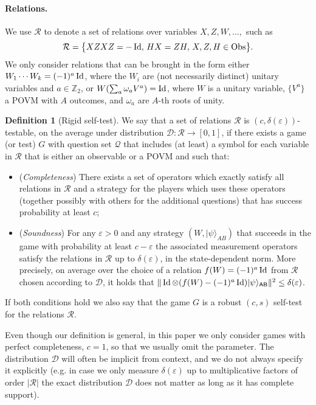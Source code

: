 \documentclass[11pt]{article}
\theoremstyle{remark}
\theoremstyle{definition}
\newtheorem{definition}[theorem]{Definition}
\newcommand{\ket}[1]{|#1\rangle}
\newcommand{\Id}{\ensuremath{\mathop{\rm Id}\nolimits}}
\newcommand{\reg}[1]{{\textsf{#1}}}
\newcommand{\Z}{\ensuremath{\mathbb{Z}}}
\newcommand{\setft}[1]{\mathrm{#1}}
\newcommand{\Obs}{\setft{Obs}}
\newcommand{\eps}{\varepsilon}
\begin{document}
\paragraph{Relations.}
We use $\mathcal{R}$ to denote a set of relations over variables $X,Z,W,\ldots,$ such as
$$\mathcal{R}=\big\{XZXZ=-\Id,\, HX=ZH,\,X,Z,H\in\Obs\big\}.$$
We only consider relations that can be brought in the form either $W_1\cdots W_k = (-1)^a \Id$, where the $W_i$ are (not necessarily distinct) unitary variables and $a\in\Z_2$, or $W ( \sum_a \omega_a V^a)=\Id$, where $W$ is a unitary variable, $\{V^a\}$ a POVM with $A$ outcomes, and $\omega_a$ are $A$-th roots of unity.   

\begin{definition}[Rigid self-test]
We say that a set of relations $\mathcal{R}$ is $(c,\delta(\eps))$-testable, on the average under distribution $\mathcal{D}:\mathcal{R}\to[0,1]$, if
  there exists a game (or test) $G$ with question set $\mathcal{Q}$ that
  includes (at least) a symbol for each variable in $\mathcal{R}$ that is either an observable or a POVM and such that:
\begin{itemize}
\item (\emph{Completeness}) There exists a set of operators which exactly satisfy all relations in $\mathcal{R}$ and a strategy for the players which uses these operators (together possibly with others for the additional questions) that has success probability at least $c$;
\item (\emph{Soundness}) For any $\eps>0$ and any strategy $(W,\ket{\psi}_{AB})$ that succeeds in the game with probability at least $c-\eps$ the associated measurement operators satisfy the relations in $\mathcal{R}$ up to $\delta(\eps)$, in the state-dependent norm. More precisely, on average
 over the choice of a relation $f(W)=(-1)^a\Id$ from $\mathcal{R}$ chosen according to $\mathcal{D}$, it holds that $\| \Id\otimes (f(W)-(-1)^a\Id) \ket{\psi}_{\reg{AB}}\|^2 \leq \delta(\eps)$.
\end{itemize}
If both conditions hold we also say that the game $G$ is a robust $(c,s)$ self-test for the relations $\mathcal{R}$. 
\end{definition}

Even though our definition is general, in this paper we only consider games with perfect completeness, $c=1$, so that we usually omit the parameter. The distribution $\mathcal{D}$ will often be implicit from context, and we do not always specify it explicitly (e.g. in case we only measure $\delta(\eps)$ up to multiplicative factors of order $|\mathcal{R}|$ the exact distribution $\mathcal{D}$ does not matter as long as it has complete support). 
\end{document}

